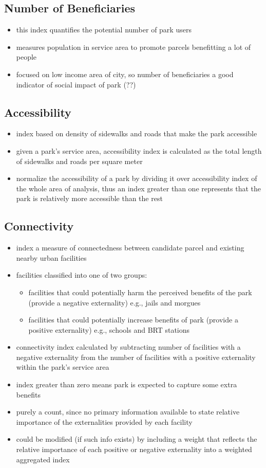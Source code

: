 \documentclass{article}
\begin{document}
\subsection{Number of Beneficiaries}
\begin{itemize}
\item this index quantifies the potential number of park users
\item measures population in service area to promote parcels benefitting a lot of people
\item focused on low income area of city, so number of beneficiaries a good indicator of social impact of park (??)
\end{itemize}
%
%
\subsection{Accessibility}
\begin{itemize}
\item index based on density of sidewalks and roads that make the park accessible
\item given a park's service area, accessibility index is calculated as the total length of sidewalks and roads per square meter
\item normalize the accessibility of a park by dividing it over accessibility index of the whole area of analysis, thus an index greater than one represents that the park is relatively more accessible than the rest
\end{itemize}
%
%
\subsection{Connectivity}
\begin{itemize}
\item index a measure of connectedness between candidate parcel and existing nearby urban facilities
\item facilities classified into one of two groups:
	\begin{itemize}
	\item facilities that could potentially harm the perceived benefits of the park (provide a negative externality) e.g., jails and morgues
	\item facilities that could potentially increase benefits of park (provide a positive externality) e.g., schools and BRT stations
	\end{itemize}
\item connectivity index calculated by subtracting number of facilities with a negative externality from the number of facilities with a positive externality within the park's service area
\item index greater than zero means park is expected to capture some extra benefits
\item purely a count, since no primary information available to state relative importance of the externalities provided by each facility
\item could be modified (if such info exists) by including a weight that reflects the relative importance of each positive or negative externality into a weighted aggregated index
\end{itemize}
%
%
\end{document}

